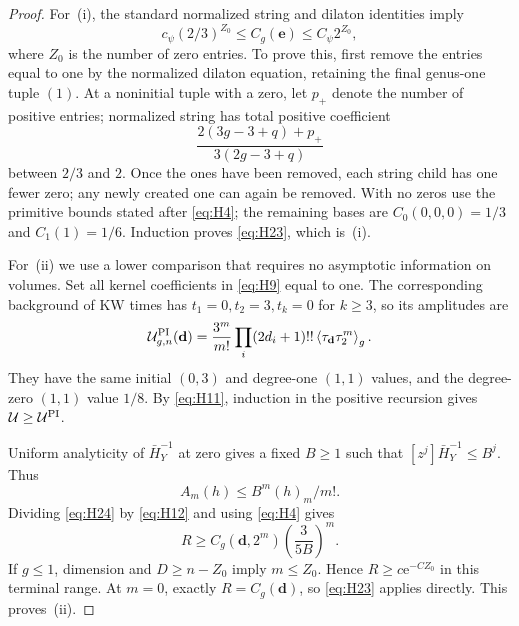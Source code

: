 \begin{proof}
For~(i), the standard normalized string and dilaton identities imply \begin{equation}
c_\psi(2/3)^{Z_0}\le C_g(\mathbf e)\le C_\psi2^{Z_0},
\label{eq:H23}
\end{equation} where \(Z_0\) is the number of zero entries. To prove
this, first remove the entries equal to one by the normalized dilaton equation,
retaining the final genus-one tuple \((1)\). At a noninitial tuple with
a zero, let \(p_+\) denote the number of positive entries; normalized
string has total positive coefficient \[
\frac{2(3g-3+q)+p_+}{3(2g-3+q)}
\] between \(2/3\) and \(2\). Once the ones have been removed, each
string child has one fewer zero; any newly created one can again be
removed. With no zeros use the primitive bounds stated after \eqref{eq:H4}; the
remaining bases are \(C_0(0,0,0)=1/3\) and \(C_1(1)=1/6\). Induction
proves \eqref{eq:H23}, which is~(i).

For~(ii) we use a lower comparison that requires no asymptotic
information on volumes. Set all kernel coefficients in \eqref{eq:H9} equal to one. The
corresponding background of KW times has \(t_1=0,t_2=3,t_k=0\) for \(k\ge3\), so its amplitudes
are \begin{equation}
\mathcal U^{\rm PI}_{g,n}(\mathbf d)
=\frac{3^m}{m!}\prod_i(2d_i+1)!!
\left\langle\tau_{\mathbf d}\tau_2^m\right\rangle_g.
\label{eq:H24}
\end{equation} They have the same initial \((0,3)\) and degree-one \((1,1)\) values,
and the degree-zero \((1,1)\) value \(1/8\). By \eqref{eq:H11}, induction in the
positive recursion gives \(\mathcal U\ge\mathcal U^{\rm PI}\).

Uniform analyticity of \(\bar H_Y^{-1}\) at zero gives a fixed \(B\ge1\) such
that \([z^j]\bar H_Y^{-1}\le B^j\). Thus \[
A_m(h)\le B^m(h)_m/m!.
\] Dividing \eqref{eq:H24} by \eqref{eq:H12} and using \eqref{eq:H4} gives \begin{equation}
R\ge C_g(\mathbf d,2^m)
       \left(\frac3{5B}\right)^m.
\label{eq:H25}
\end{equation} If \(g\le1\), dimension and \(D\ge n-Z_0\) imply \(m\le Z_0\). Hence
\(R\ge c\mathrm{e}^{-CZ_0}\) in this terminal range. At \(m=0\), exactly
\(R=C_g(\mathbf d)\), so \eqref{eq:H23} applies directly. This proves~(ii).


\end{proof}

